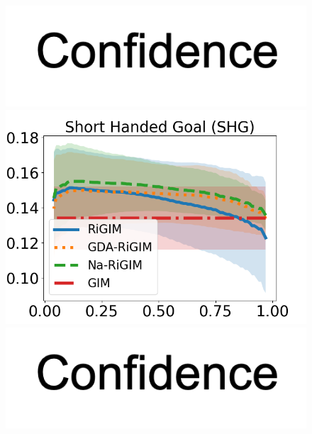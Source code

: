 \documentclass{article}
\begin{document}
\begin{figure}[htbp]
\begin{minipage}{0.16\textwidth}
    \vspace{-0.05in}
    \includegraphics[scale=0.15]{figures/confidence_x_label.png}
    \end{minipage}
    \begin{minipage}{0.16\textwidth}
    \centering
    \includegraphics[scale=0.17]{figures/risk_curve_SHG_shadow.png}\par
    \vspace{-0.05in}
    \includegraphics[scale=0.15]{figures/confidence_x_label.png}
    \end{minipage}
    \begin{minipage}{0.16\textwidth}
    \centering

\end{minipage}
\end{figure}
\end{document}
